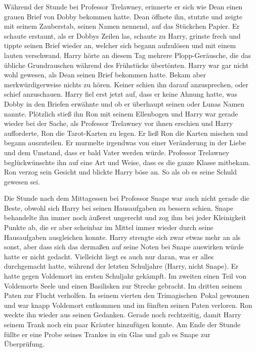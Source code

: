 Während der Stunde bei Professor Trelawney, erinnerte er sich wie Dean einen grauen Brief von Dobby bekommen hatte. Dean öffnete ihn, stutzte und zeigte mit seinem Zauberstab, seinen Namen nennend, auf das Stückchen Papier. Er schaute erstaunt, als er Dobbys Zeilen las, schaute zu Harry, grinste frech und tippte seinen Brief wieder an, welcher sich begann aufzulösen und mit einem lauten  verschwand. Harry hörte an diesem Tag mehrere Plopp-Geräusche, die das übliche Grundrauschen während des Frühstücks übertönten. Harry war gar nicht wohl gewesen, als Dean seinen Brief bekommen hatte. Bekam aber merkwürdigerweise nichts zu hören. Keiner schien ihn darauf anzusprechen, oder schief anzuschauen. Harry fiel erst jetzt auf, dass er keine Ahnung hatte, was Dobby in den Briefen erwähnte und ob er überhaupt seinen oder Lunas Namen nannte. Plötzlich stieß ihn Ron mit seinem Ellenbogen und Harry war gerade wieder bei der Sache, als Professor Trelawney vor ihnen erschien und Harry aufforderte, Ron die Tarot-Karten zu legen. Er ließ Ron die Karten mischen und begann auszuteilen. Er murmelte irgendwas von einer Veränderung in der Liebe und dem Umstand, dass er bald Vater werden würde. Professor Trelawney beglückwünschte ihn auf eine Art und Weise, dass es die ganze Klasse mitbekam. Ron verzog sein Gesicht und blickte Harry böse an. So als ob es seine Schuld gewesen sei.

Die Stunde nach dem Mittagessen bei Professor Snape war auch nicht gerade die Beste, obwohl sich Harry bei seinen Hausaufgaben zu bessern schien. Snape behandelte ihn immer noch äußerst ungerecht und zog ihm bei jeder Kleinigkeit Punkte ab, die er aber scheinbar im Mittel immer wieder durch seine Hausaufgaben ausgleichen konnte. Harry strengte sich zwar etwas mehr an als sonst, aber dass sich das dermaßen auf seine Noten bei Snape auswirken würde hatte er nicht gedacht. Vielleicht liegt es auch nur daran, was er alles durchgemacht hatte, während der letzten Schuljahre (Harry, nicht Snape). Er hatte gegen Voldemort im ersten Schuljahr gekämpft. Im zweiten einen Teil von Voldemorts Seele und einen Basilisken zur Strecke gebracht. Im dritten seinem Paten zur Flucht verholfen. In seinem vierten den Trimagischen~Pokal gewonnen und war knapp Voldemort entkommen und im fünften seinen Paten verloren. Ron weckte ihn wieder aus seinen Gedanken. Gerade noch rechtzeitig, damit Harry seinem Trank noch ein paar Kräuter hinzufügen konnte. Am Ende der Stunde füllte er eine Probe seines Trankes in ein Glas und gab es Snape zur Überprüfung.

